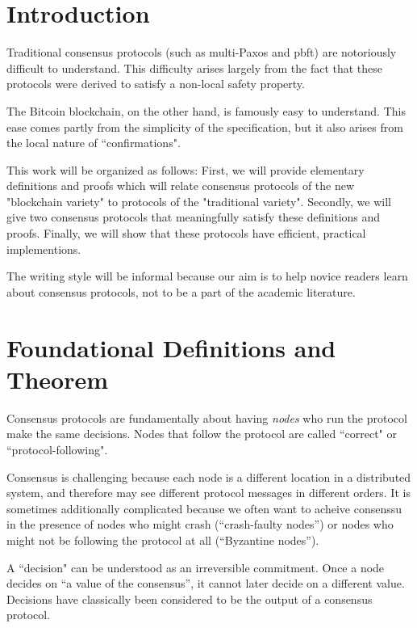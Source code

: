 \documentclass{article}
\theoremstyle{definition}
\begin{document}
\iffalse



\section{Introduction}
Traditional consensus protocols (such as multi-Paxos and pbft) are notoriously difficult to understand. This difficulty arises largely from the fact that these protocols were derived to satisfy a non-local safety property.

The Bitcoin blockchain, on the other hand, is famously easy to understand. This ease comes partly from the simplicity of the specification, but it also arises from the local nature of ``confirmations".

This work will be organized as follows: First, we will provide elementary definitions and proofs which will relate consensus protocols of the new "blockchain variety" to protocols of the "traditional variety". Secondly, we will give two consensus protocols that meaningfully satisfy these definitions and proofs. Finally, we will show that these protocols have efficient, practical implementions.

The writing style will be informal because our aim is to help novice readers learn about consensus protocols, not to be a part of the academic literature.

\section{Foundational Definitions and Theorem}

Consensus protocols are fundamentally about having \emph{nodes} who run the protocol make the same decisions. Nodes that follow the protocol are called ``correct" or ``protocol-following". 

Consensus is challenging because each node is a different location in a distributed system, and therefore may see different protocol messages in different orders. It is sometimes additionally complicated because we often want to acheive consenssu in the presence of nodes who might crash (``crash-faulty nodes'') or nodes who might not be following the protocol at all (``Byzantine nodes'').

A ``decision" can be understood as an irreversible commitment. Once a node decides on ``a value of the consensus'', it cannot later decide on a different value. Decisions have classically been considered to be the output of a consensus protocol.
\end{document}
